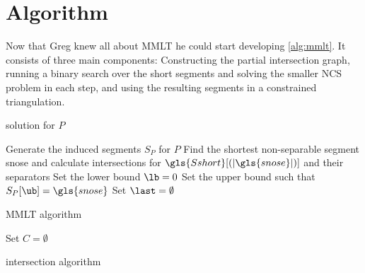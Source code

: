 \section{Algorithm}
Now that Greg knew all about \gls{MMLT} he could start developing
\cref{alg:mmlt}. It consists of three main components: Constructing
the partial intersection graph, running a binary search over the short
segments and solving the smaller \gls{NCS} problem in each step, and
using the resulting segments in a constrained triangulation.

\begin{algorithm}
  \DontPrintSemicolon
   solution for \(P\)
  
  
  Generate the induced segments \(S_P\) for \(P\) \;
  Find the shortest non-separable segment \gls{snose}
  and calculate intersections for 
  \(\gls{Sshort}[(|\gls{snose}|)]\) and their separators \;
  Set the lower bound \(\lb = 0\) \;
  Set the upper bound \ub such that \(S_P[\ub] = \gls{snose}\) \;
  Set \(\last = \emptyset\) \;
  \caption{\label{alg:mmlt}\gls{MMLT} algorithm}
\end{algorithm}

\begin{algorithm}
  \DontPrintSemicolon
  
  
  Set \(C = \emptyset\) \;
  \caption{intersection algorithm}
\end{algorithm}
  
